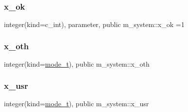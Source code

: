 \subsubsection{\texorpdfstring{x\+\_\+ok}{x\_ok}}
{\footnotesize\ttfamily integer(kind=c\+\_\+int), parameter, public m\+\_\+system\+::x\+\_\+ok =1}

\mbox{\label{namespacem__system_a5863ec37dc7d85f9c3f20cc511d26bb4}} 
\subsubsection{\texorpdfstring{x\+\_\+oth}{x\_oth}}
{\footnotesize\ttfamily integer(kind=\mbox{\hyperlink{namespacem__system_abdb5cc27c945379d844db4830d499050}{mode\+\_\+t}}), public m\+\_\+system\+::x\+\_\+oth}

\mbox{\label{namespacem__system_a450a3fddafad75b241f370b47b17d97c}} 
\subsubsection{\texorpdfstring{x\+\_\+usr}{x\_usr}}
{\footnotesize\ttfamily integer(kind=\mbox{\hyperlink{namespacem__system_abdb5cc27c945379d844db4830d499050}{mode\+\_\+t}}), public m\+\_\+system\+::x\+\_\+usr}

